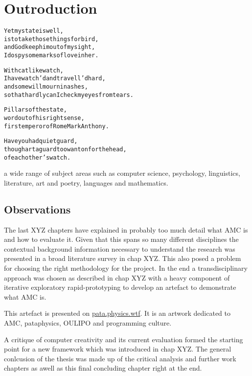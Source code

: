 
\chapter{Outroduction}
\label{ch:observations}

\startcontents[chapters]

\vfill

\begin{alltt}\sffamily
Yet my state is well,
is to take those things for bird,
and God keep him out of my sight,
I do spy some marks of love in her.

With catlike watch,
I have watch'd and travell'd hard,
and some will mourn in ashes,
so that hardly can I check my eyes from tears.

Pillars of the state,
word out of his right sense,
first emperor of Rome Mark Anthony.

Have you had quiet guard,
though art a guard too wanton for the head,
of each other's watch.
\end{alltt}

\newpage
\minicontents
\spirals


a wide range of subject areas such as computer science, psychology, linguistics, literature, art and poetry, languages and mathematics.


\section{Observations}

The last XYZ chapters have explained in probably too much detail what \ac{AMC} is and how to evaluate it. Given that this spans so many different disciplines the contextual background information necessary to understand the research was presented in a broad literature survey in chap XYZ. This also posed a problem for choosing the right methodology for the project. In the end a transdisciplinary approach was chosen as described in chap XYZ with a heavy component of iterative exploratory rapid-prototyping to develop an artefact to demonstrate what \ac{AMC} is. 

This artefact is presented on \url{pata.physics.wtf}. It is an artwork dedicated to \ac{AMC}, pataphysics, \ac{OULIPO} and programming culture.

A critique of computer creativity and its current evaluation formed the starting point for a new framework which was introduced in chap XYZ. The general conlcusion of the thesis was made up of the critical analysis and further work chapters as awell as this final concluding chapter right at the end.

